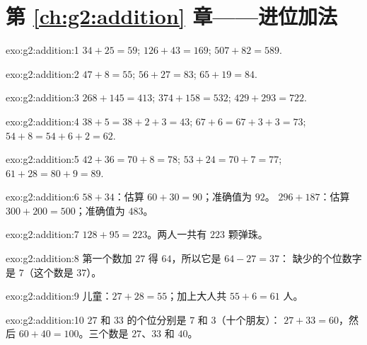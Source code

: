 \section*{第 \ref{ch:g2:addition} 章——进位加法}

\begin{solution}{exo:g2:addition:1}
$34 + 25 = 59$; \quad $126 + 43 = 169$; \quad $507 + 82 = 589$.
\end{solution}

\begin{solution}{exo:g2:addition:2}
$47 + 8 = 55$; \quad $56 + 27 = 83$; \quad $65 + 19 = 84$.
\end{solution}

\begin{solution}{exo:g2:addition:3}
$268 + 145 = 413$; \quad $374 + 158 = 532$; \quad
$429 + 293 = 722$.
\end{solution}

\begin{solution}{exo:g2:addition:4}
$38 + 5 = 38 + 2 + 3 = 43$; \quad $67 + 6 = 67 + 3 + 3 = 73$; \quad
$54 + 8 = 54 + 6 + 2 = 62$.
\end{solution}

\begin{solution}{exo:g2:addition:5}
$42 + 36 = 70 + 8 = 78$; \quad $53 + 24 = 70 + 7 = 77$; \quad
$61 + 28 = 80 + 9 = 89$.
\end{solution}

\begin{solution}{exo:g2:addition:6}
$58 + 34$：估算 $60 + 30 = 90$；准确值为 $92$。
$296 + 187$：估算 $300 + 200 = 500$；准确值为 $483$。
\end{solution}

\begin{solution}{exo:g2:addition:7}
$128 + 95 = 223$。两人一共有 $223$ 颗弹珠。
\end{solution}

\begin{solution}{exo:g2:addition:8}
第一个数加 $27$ 得 $64$，所以它是 $64 - 27 = 37$：
缺少的个位数字是 $7$（这个数是 $37$）。
\end{solution}

\begin{solution}{exo:g2:addition:9}
儿童：$27 + 28 = 55$；加上大人共 $55 + 6 = 61$
人。
\end{solution}

\begin{solution}{exo:g2:addition:10}
$27$ 和 $33$ 的个位分别是 $7$ 和 $3$（十个朋友）：
$27 + 33 = 60$，然后 $60 + 40 = 100$。三个数是
$27$、$33$ 和 $40$。
\end{solution}
